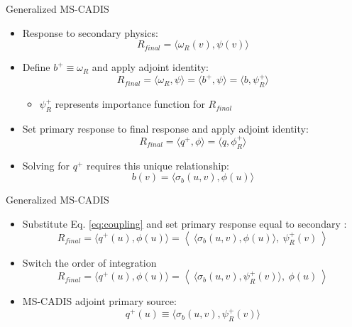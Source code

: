 \documentclass{beamer}
\begin{document}
\begin{frame}{Generalized MS-CADIS}
\begin{itemize}
\item{Response to secondary physics:}
\begin{equation} \label{eq:response}
  R_{final} = \langle \omega_R(v), \psi(v) \rangle
\end{equation}
\pause
\item{Define  $b^+ \equiv \omega_R$ and apply adjoint
	identity:}
\begin{equation}
  R_{final} = \langle \omega_R, \psi \rangle 
	= \langle b^+, \psi \rangle
	= \langle b, \psi_R^{+}\rangle
\end{equation}
		\vspace{-0.4cm}          
		\begin{itemize}
		\item{$\psi_R^+$ represents importance function for $R_{final}$}
		\end{itemize}
		\vspace{0.4cm}         
\pause
\item{Set primary response to final response and apply adjoint
	identity:}
	\begin{equation}
		R_{final} = \langle q^+, \phi \rangle
		          = \langle q, \phi_R^+ \rangle
	\end{equation}
\pause
\item{Solving for $q^+$ requires this unique relationship:}
          \begin{equation}\label{eq:coupling}
            b(v) = \langle \sigma_b(u,v), \phi(u) \rangle
          \end{equation}


\end{itemize}
\end{frame}

\begin{frame}{Generalized MS-CADIS}
\begin{itemize}
\item{Substitute Eq. \ref{eq:coupling} and set primary response equal to secondary :}
\begin{equation}
	R_{final} = \langle q^+(u), \phi(u) \rangle
	=\left \langle\  \langle \sigma_b(u,v) , \phi(u) \rangle,\
	\psi_R^{+}(v) \ \right\rangle
\end{equation}
\pause
	\item{Switch the order of integration}
\begin{equation}\label{eq:pseudo-response}
	R_{final} = \langle q^+(u), \phi(u) \rangle
	=\left \langle \ \langle \sigma_b(u,v) , \psi_R^{+}(v) \rangle,\
	\phi(u) \ \right\rangle
\end{equation}
		\vspace{0.2cm}
\pause
\item{MS-CADIS adjoint primary source:}
\begin{equation}
  q^{+}(u) \equiv \langle \sigma_b(u,v) , \psi_R^{+}(v) \rangle
\end{equation}
\end{itemize}
\end{frame}
\end{document}
